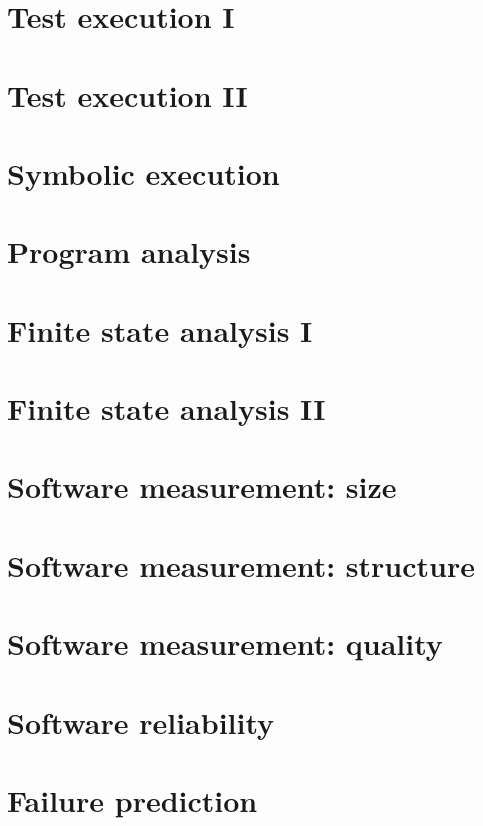 \chapter{Test execution I}

\chapter{Test execution II}

\chapter{Symbolic execution}

\chapter{Program analysis}

\chapter{Finite state analysis I}

\chapter{Finite state analysis II}

\chapter{Software measurement: size}

\chapter{Software measurement: structure}

\chapter{Software measurement: quality}

\chapter{Software reliability}

\chapter{Failure prediction}

